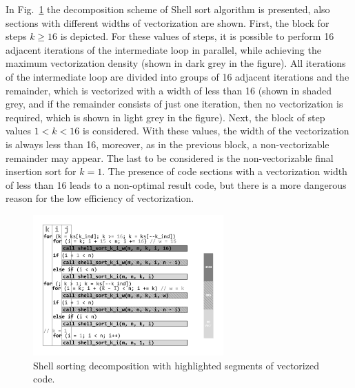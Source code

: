 \documentclass[
11pt,%
tightenlines,%
twoside,%
onecolumn,%
nofloats,%
nobibnotes,%
nofootinbib,%
superscriptaddress,%
noshowpacs,%
centertags]%
{revtex4}
\begin{document}
In Fig.~\ref{pic:decompos} the decomposition scheme of Shell sort algorithm is presented, also sections with different widths of vectorization are shown.
First, the block for steps $ k \ge 16 $ is depicted.
For these values of steps, it is possible to perform 16 adjacent iterations of the intermediate loop in parallel, while achieving the maximum vectorization density (shown in dark grey in the figure).
All iterations of the intermediate loop are divided into groups of 16 adjacent iterations and the remainder, which is vectorized with a width of less than 16 (shown in shaded grey, and if the remainder consists of just one iteration, then no vectorization is required, which is shown in light grey in the figure).
Next, the block of step values $ 1 < k < 16 $ is considered.
With these values, the width of the vectorization is always less than 16, moreover, as in the previous block, a non-vectorizable remainder may appear.
The last to be considered is the non-vectorizable final insertion sort for $ k = 1 $.
The presence of code sections with a vectorization width of less than 16 leads to a non-optimal result code, but there is a more dangerous reason for the low efficiency of vectorization.

\begin{figure}[h]
\setcaptionmargin{5mm}
\onelinecaptionsfalse
\includegraphics[width=0.65\textwidth]{pics/pic_decomposition.pdf}
\caption{Shell sorting decomposition with highlighted segments of vectorized code.}\label{pic:decompos}
\end{figure}
\end{document}
